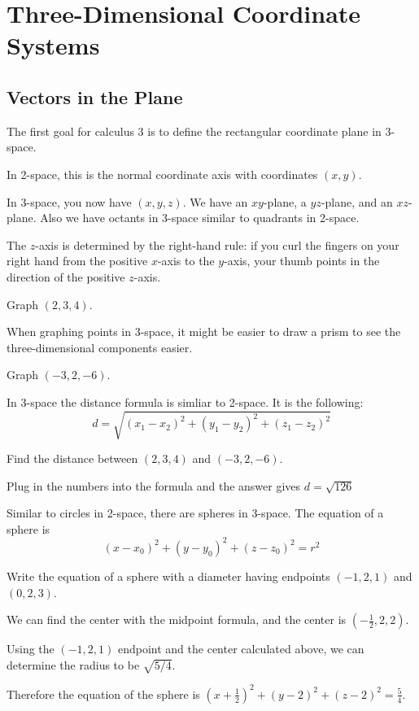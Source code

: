 \documentclass[../calc3.tex]{subfiles}
\begin{document}
\chapter{Three-Dimensional Coordinate Systems}
\section{Vectors in the Plane}
The first goal for calculus 3 is to define the rectangular coordinate plane in 3-space.

In 2-space, this is the normal coordinate axis with coordinates $(x,y)$.

In 3-space, you now have $(x,y,z)$. We have an $xy$-plane, a $yz$-plane, and an $xz$-plane. Also we have octants in 3-space similar to quadrants in 2-space.

The $z$-axis is determined by the right-hand rule: if you curl the fingers on your right hand from the positive $x$-axis to the $y$-axis, your thumb points in the direction of the positive $z$-axis.

\ex Graph $(2,3,4)$.

When graphing points in 3-space, it might be easier to draw a prism to see the three-dimensional components easier.

\ex Graph $(-3,2,-6)$.

In 3-space the distance formula is simliar to 2-space. It is the following:
\[ d=\sqrt{(x_1-x_2)^2+(y_1-y_2)^2+(z_1-z_2)^2} \]

\begin{example}
    Find the distance between $(2,3,4)$ and $(-3,2,-6)$.

    Plug in the numbers into the formula and the answer gives $d=\sqrt{126}$
\end{example}

Similar to circles in 2-space, there are spheres in 3-space. The equation of a sphere is 
\[ (x-x_0)^2+(y-y_0)^2+(z-z_0)^2=r^2 \]

\begin{example}
    Write the equation of a sphere with a diameter having endpoints $(-1,2,1)$ and $(0,2,3)$.

    We can find the center with the midpoint formula, and the center is $(-\frac{1}{2},2,2)$.

    Using the $(-1,2,1)$ endpoint and the center calculated above, we can determine the radius to be $\sqrt{5/4}$.

    Therefore the equation of the sphere is $(x+\frac{1}{2})^2+(y-2)^2+(z-2)^2=\frac{5}{4}$.
\end{example}
\end{document}

